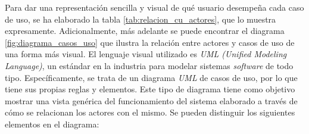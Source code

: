 Para dar una representación sencilla y visual de qué usuario desempeña cada caso de uso, se ha elaborado la tabla \ref{tab:relacion_cu_actores}, que lo muestra expresamente.
Adicionalmente, más adelante se puede encontrar el diagrama \ref{fig:diagrama_casos_uso} que ilustra la relación entre actores y casos de uso de una forma más visual. El lenguaje visual utilizado es \textit{UML (Unified Modeling Language)}, un estándar en la industria para modelar sistemas \textit{software} de todo tipo. Específicamente, se trata de un diagrama \textit{UML} de casos de uso, por lo que tiene sus propias reglas y elementos.
Este tipo de diagrama tiene como objetivo mostrar una vista genérica del funcionamiento del sistema elaborado a través de cómo se relacionan los actores con el mismo. Se pueden distinguir los siguientes elementos en el diagrama:

